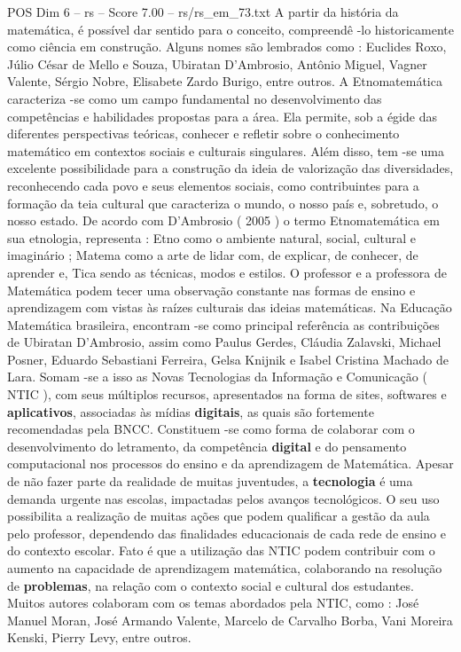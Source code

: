 \begin{textsample}{POS Dim 6 – rs – Score 7.00 – rs/rs\_em\_73.txt}
A partir da história da matemática, é possível dar sentido para o conceito, compreendê -lo historicamente como ciência em construção.
Alguns nomes são lembrados como : Euclides Roxo, Júlio César de Mello e Souza, Ubiratan D’Ambrosio, Antônio Miguel, Vagner Valente, Sérgio Nobre, Elisabete Zardo Burigo, entre outros.
A Etnomatemática caracteriza -se como um campo fundamental no desenvolvimento das competências e habilidades propostas para a área.
Ela permite, sob a égide das diferentes perspectivas teóricas, conhecer e refletir sobre o conhecimento matemático em contextos sociais e culturais singulares.
Além disso, tem -se uma excelente possibilidade para a construção da ideia de valorização das diversidades, reconhecendo cada povo e seus elementos sociais, como contribuintes para a formação da teia cultural que caracteriza o mundo, o nosso país e, sobretudo, o nosso estado.
De acordo com D’Ambrosio ( 2005 ) o termo Etnomatemática em sua etnologia, representa : Etno como o ambiente natural, social, cultural e imaginário ; Matema como a arte de lidar com, de explicar, de conhecer, de aprender e, Tica sendo as técnicas, modos e estilos.
O professor e a professora de Matemática podem tecer uma observação constante nas formas de ensino e aprendizagem com vistas às raízes culturais das ideias matemáticas.
Na Educação Matemática brasileira, encontram -se como principal referência as contribuições de Ubiratan D’Ambrosio, assim como Paulus Gerdes, Cláudia Zalavski, Michael Posner, Eduardo Sebastiani Ferreira, Gelsa Knijnik e Isabel Cristina Machado de Lara.
Somam -se a isso as Novas Tecnologias da Informação e Comunicação ( NTIC ), com seus múltiplos recursos, apresentados na forma de sites, softwares e \textbf{aplicativos}, associadas às mídias \textbf{digitais}, as quais são fortemente recomendadas pela BNCC.
Constituem -se como forma de colaborar com o desenvolvimento do letramento, da competência \textbf{digital} e do pensamento computacional nos processos do ensino e da aprendizagem de Matemática.
Apesar de não fazer parte da realidade de muitas juventudes, a \textbf{tecnologia} é uma demanda urgente nas escolas, impactadas pelos avanços tecnológicos.
O seu uso possibilita a realização de muitas ações que podem qualificar a gestão da aula pelo professor, dependendo das finalidades educacionais de cada rede de ensino e do contexto escolar.
Fato é que a utilização das NTIC podem contribuir com o aumento na capacidade de aprendizagem matemática, colaborando na resolução de \textbf{problemas}, na relação com o contexto social e cultural dos estudantes.
Muitos autores colaboram com os temas abordados pela NTIC, como : José Manuel Moran, José Armando Valente, Marcelo de Carvalho Borba, Vani Moreira Kenski, Pierry Levy, entre outros.

\end{textsample}
